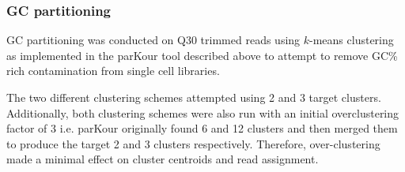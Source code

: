\begin{table}
    \centering

    \caption[Library sizes after trimming]{Summary of the library size of the taxonomically selected single cell 
        libraries before and after trimming at a minimum average SLIDINGWINDOW quality 
        threshold of Q30. Of interest, Dark1-2 was generally of poor quality and thus 
        was disproportionately minimised by trimming. Additionally, the 
        two bulk RNAseq libraries were trimmed at Q20 in FastQ-MCF resulting in 
    total library sizes of \(2.458*10^{7}\) and \(2.779*10^{7}\) respectively.}
\end{table}

\subsubsection{GC partitioning} 

GC partitioning was conducted on Q30 trimmed reads 
using \(k\)-means clustering as implemented in the parKour tool described above 
to attempt to remove GC\% rich contamination from single cell libraries.

The two different clustering schemes attempted using 2 and 3 target clusters.
Additionally, both clustering schemes were also run with an initial overclustering factor of 3
i.e. parKour originally found 6 and 12 clusters and then merged them to produce the target 2 and 3 
clusters respectively. Therefore, over-clustering made a minimal effect on cluster centroids and read assignment.

